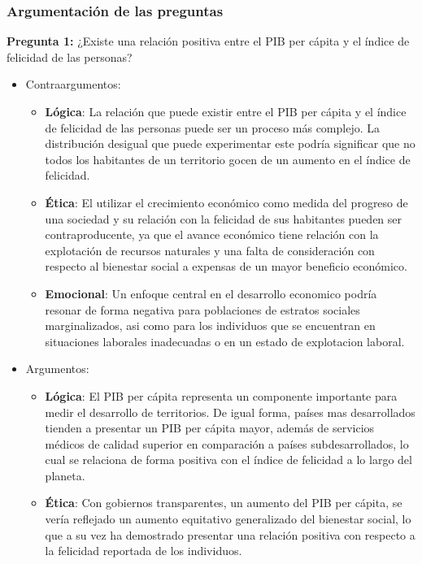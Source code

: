 \documentclass[12pt,oneside,letterpaper,spanish]{article}
\begin{document}
\newpage
\subsubsection{Argumentación de las preguntas}

\textbf{Pregunta 1:} ¿Existe una relación positiva entre el PIB per cápita y el índice de felicidad de las personas?
\begin{itemize}
    \item Contraargumentos:
    \begin{itemize}
        \item \textbf{Lógica}: La relación que puede existir entre el PIB per cápita y el índice de felicidad de las personas puede ser un proceso más complejo. La distribución desigual que puede experimentar este podría significar que no todos los habitantes de un territorio gocen de un aumento en el índice de felicidad.
        \item \textbf{Ética}: El utilizar el crecimiento económico como medida del progreso de una sociedad y su relación con la felicidad de sus habitantes pueden ser contraproducente, ya que el avance económico tiene relación con la explotación de recursos naturales y una falta de consideración con respecto al bienestar social a expensas de un mayor beneficio económico.
        \item \textbf{Emocional}: Un enfoque central en el desarrollo economico podría resonar de forma negativa para poblaciones de estratos sociales marginalizados, asi como para los individuos que se encuentran en situaciones laborales inadecuadas o en un estado de explotacion laboral.
    \end{itemize}
    \item Argumentos:
    \begin{itemize}
        \item \textbf{Lógica}: El PIB per cápita representa un componente importante para medir el desarrollo de territorios. De igual forma, países mas desarrollados tienden a presentar un PIB per cápita mayor, además de servicios médicos de calidad superior en comparación a países subdesarrollados, lo cual se relaciona de forma positiva con el índice de felicidad a lo largo del planeta.
        \item \textbf{Ética}: Con gobiernos transparentes, un aumento del PIB per cápita, se vería reflejado un aumento equitativo generalizado del bienestar social, lo que a su vez ha demostrado presentar una relación positiva con respecto a la felicidad reportada de los individuos.

\end{itemize}
\end{itemize}
\end{document}
